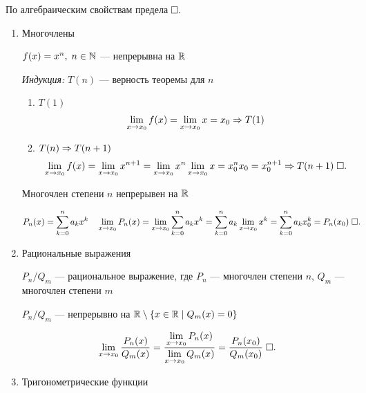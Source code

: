 \documentclass{article}
\begin{document}
\proof

По алгебраическим свойствам предела$\qed$

\pagebreak


\begin{enumerate}
	\item{}Многочлены

	\theorem

	$f(x)=x^{n},\;n\in\N$ --- непрерывна на $\R$

	\proof

	{\it Индукция:} $T(n)$ --- верность теоремы для $n$
	\begin{enumerate}
		\item{}$T(1)$
		\begin{align*}
			\slim{x\to x_0}f(x)=\slim{x\to x_0}x=x_0\Rarr T(1)
		\end{align*}
		\item{}$T(n)\Rarr T(n+1)$
		\begin{align*}
			\slim{x\to x_0}f(x)=\slim{x\to x_0}x^{n+1}=\slim{x\to x_0}x^{n}\slim{x\to x_0}x=x_0^{n}x_0=x_0^{n+1}\Rarr T(n+1)\qed
		\end{align*}
	\end{enumerate}

	\theorem

	Многочлен степени $n$ непрерывен на $\R$

	\proof
	\begin{align*}
		 & P_{n}(x)=\sum_{k=0}^{n}a_{k}x^{k} &  & \slim{x\to x_0}P_{n}(x)=\slim{x\to x_0}\sum_{k=0}^{n}a_{k}x^{k}=
		\sum_{k=0}^{n}a_{k}\slim{x\to x_0}x^{k}=\sum_{k=0}^{n}a_{k}x_0^{k}=P_{n}(x_0)\qed
	\end{align*}

	\item{}Рациональные выражения

	\theorem

	$P_{n}/Q_{m}$ --- рациональное выражение, где $P_{n}$ --- многочлен степени $n$, $Q_{m}$ --- многочлен степени $m$

	$P_{n}/Q_{m}$ --- непрерывно на $\R\setminus\setdef{x\in\R}{Q_{m}(x)=0}$

	\proof
	\begin{align*}
		\slim{x\to x_0}\frac{P_{n}(x)}{Q_{m}(x)}=\frac{\slim{x\to x_0}P_{n}(x)}{\slim{x\to x_0}Q_{m}(x)}=\frac{P_{n}(x_0)}{Q_{m}(x_0)}\qed
	\end{align*}

	\item{}Тригонометрические функции


\end{enumerate}
\end{document}
